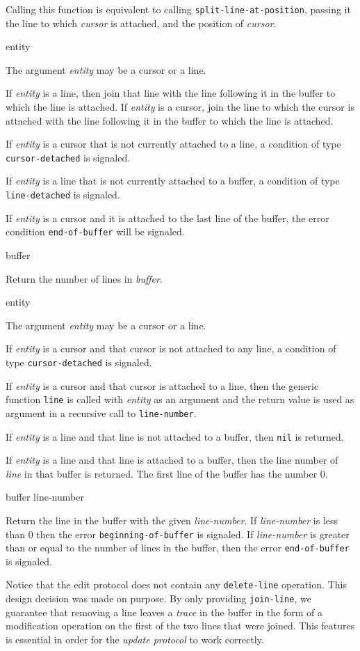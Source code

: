 Calling this function is equivalent to calling
\texttt{split-line-at-position}, passing it the line to which
\textit{cursor} is attached, and the position of \textit{cursor}.

\ifdetached{}

 {entity}

The argument \textit{entity} may be a cursor or a line.

If \textit{entity} is a line, then join that line with the line
following it in the buffer to which the line is attached.  If
\textit{entity} is a cursor, join the line to which the cursor is
attached with the line following it in the buffer to which the line is
attached.

If \textit{entity} is a cursor that is not currently attached to a
line, a condition of type \texttt{cursor-detached} is signaled.

If \textit{entity} is a line that is not currently attached to a
buffer, a condition of type \texttt{line-detached} is signaled.

If \textit{entity} is a cursor and it is attached to the last line of
the buffer, the error condition \texttt{end-of-buffer} will be
signaled.

 {buffer}

Return the number of lines in \textit{buffer}.

 {entity}

The argument \textit{entity} may be a cursor or a line.

If \textit{entity} is a cursor and that cursor is not attached to any
line, a condition of type \texttt{cursor-detached} is signaled.

If \textit{entity} is a cursor and that cursor is attached to a line,
then the generic function \texttt{line}  is
called with \textit{entity} as an argument and the return value is
used as argument in a recursive call to \texttt{line-number}.

If \textit{entity} is a line and that line is not attached to a
buffer, then \texttt{nil} is returned.

If \textit{entity} is a line and that line is attached to a buffer,
then the line number of \textit{line} in that buffer is returned.  The
first line of the buffer has the number $0$.

 {buffer line-number}

Return the line in the buffer with the given \textit{line-number}.  If
\textit{line-number} is less than $0$ then the error
\texttt{beginning-of-buffer} is signaled.  If \textit{line-number} is
greater than or equal to the number of lines in the buffer, then the
error \texttt{end-of-buffer} is signaled.

Notice that the edit protocol does not contain any
\texttt{delete-line} operation.  This design decision was made on
purpose.  By only providing \texttt{join-line}, we guarantee that
removing a line leaves a \emph{trace} in the buffer in the form of a
modification operation on the first of the two lines that were
joined.  This features is essential in order for the \emph{update
  protocol} to work correctly.
